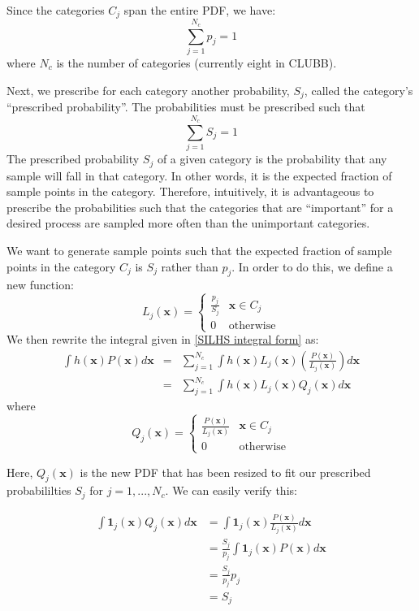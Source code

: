 \documentclass[11pt,fleqn]{article}
\begin{document}
Since the categories $C_j$ span the entire PDF, we have:
\begin{equation}
\sum_{j=1}^{N_c} p_j = 1
\end{equation}
where $N_c$ is the number of categories (currently eight in CLUBB).

Next, we prescribe for each category another probability, $S_j$, called the
category's ``prescribed probability''. The probabilities must be prescribed such
that
\begin{equation}
\sum_{j=1}^{N_c} S_j = 1
\end{equation}
The prescribed probability $S_j$ of a given category is the probability that any
sample will fall in that category. In other words, it is the expected fraction
of sample points in the category. Therefore, intuitively, it is advantageous to
prescribe the probabilities such that the categories that are ``important'' for
a desired process are sampled more often than the unimportant categories.

We want to generate sample points such that the expected fraction of sample
points in the category $C_j$ is $S_j$ rather than $p_j$. In order to do this,
we define a new function:
\[ L_j(\mathbf{x}) = 
   \begin{cases} 
      \frac{p_j}{S_j} & \mathbf{x}\in C_j \\
      0 & \text{otherwise} 
   \end{cases}
\]
We then rewrite the integral given in \eqref{SILHS integral form} as:
\begin{eqnarray}
 \int h(\mathbf{x}) P(\mathbf{x}) d\mathbf{x} &=&
     \sum\limits_{j=1}^{N_c}\int h(\mathbf{x}) L_j(\mathbf{x})\left(\frac{P(\mathbf{x})}{L_j(\mathbf{x})}\right)d\mathbf{x} \\ \nonumber
 &=& \sum\limits_{j=1}^{N_c}\int h(\mathbf{x}) L_j(\mathbf{x}) Q_j(\mathbf{x}) d\mathbf{x}
 \label{SILHS integral rewrite}
\end{eqnarray}
where
\[Q_j(\mathbf{x}) = 
   \begin{cases} 
      \frac{P(\mathbf{x})}{L_j(\mathbf{x})} & \mathbf{x}\in C_j \\
      0 & \text{otherwise} 
   \end{cases}
\]

Here, $Q_j(\mathbf{x})$ is the new PDF that has been resized to fit our prescribed
probabililties $S_j$ for $j=1,...,N_c$. We can easily verify this: 

\begin{align}
\int \mathbf{1}_j(\mathbf{x}) Q_j(\mathbf{x}) d\mathbf{x} &= \int\mathbf{1}_j(\mathbf{x}) \frac{P(\mathbf{x})}{L_j(\mathbf{x})} d\mathbf{x} \\
 &= \frac{S_j}{p_j} \int \mathbf{1}_j(\mathbf{x}) P(\mathbf{x}) d\mathbf{x} \\
 &= \frac{S_j}{p_j} p_j \\
 &= S_j
\end{align}
\end{document}
